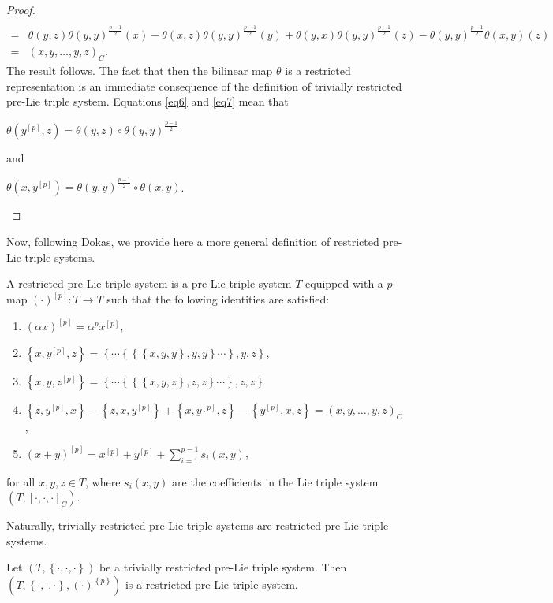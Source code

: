 \documentclass[11pt, twoside]{article}
\begin{document}
\begin{proof}
\begin{align*}
          \\ = & \theta(y,z)\theta(y,y)^{\frac{p-1}{2}}(x) - \theta(x,z)\theta(y,y)^{\frac{p-1}{2}}(y) + \theta(y,x)\theta(y,y)^{\frac{p-1}{2}}(z) - \theta(y,y)^{\frac{p-1}{2}}\theta(x,y)(z) 
          \\ = & (x,y,\ldots,y,z)_C.
     \end{align*} The result follows. The fact that then the bilinear map $\theta$ is a restricted representation is an immediate consequence of the definition of  trivially restricted pre-Lie triple system.  Equations \eqref{eq6} and \eqref{eq7} mean that  \begin{center}
    $\theta(y^{[p]},z)=\theta(y,z) \circ \theta(y,y)^{\frac{p-1}{2}} $ 
    \end{center} and 
    \begin{center} $\theta(x,y^{[p]})= \theta(y,y)^{\frac{p-1}{2}}\circ\theta(x,y) $.
    \end{center} 
\end{proof}

Now, following Dokas, we provide here a more general definition of restricted pre-Lie triple systems.

\begin{defi}\label{D5.14}
    A restricted pre-Lie triple system is a pre-Lie triple system $T$ equipped with a $p$-map $(\cdot)^{[p]}:T\to T $ such that the following identities are satisfied: \begin{enumerate}
        \item $(\alpha x)^{[p]}= \alpha^px^{[p]} $,
        \item $\left\{ x,y^{[p]},z\right\}=\left\{\cdots \left\{\left\{\left\{ x,y,y\right\},y,y \right\}\cdots\right\},y,z\right\} $,
        \item $\left\{ x,y,z^{[p]} \right\}=\left\{\cdots \left\{\left\{\left\{ x,y,z\right\},z,z \right\}\cdots\right\},z,z\right\} $
        \item $\left\{ z,y^{[p]},x\right\}-\left\{z,x,y^{[p]} \right\}+\left\{ x,y^{[p]} ,z\right\}-\left\{y^{[p]},x,z \right\}= (x,y,\ldots,y,z)_C $,
        \item $(x+y)^{[p]}= x^{[p]}+y^{[p]}+ \sum\limits_{i=1}^{p-1} s_i(x,y) $,    
    \end{enumerate} for all $x,y,z\in T$, where $s_i(x,y)$ are the coefficients in the Lie triple system $(T,[\cdot,\cdot,\cdot]_C) $.
\end{defi}
Naturally, trivially restricted pre-Lie triple systems are restricted pre-Lie triple systems.
\begin{prop}
    Let $(T,\left\{ \cdot,\cdot,\cdot\right\})$ be a trivially restricted pre-Lie triple system. Then $(T,\left\{ \cdot,\cdot,\cdot\right\},(\cdot)^{\left\{p\right\}}) $ is a restricted pre-Lie triple system.
\end{prop}
\end{document}
